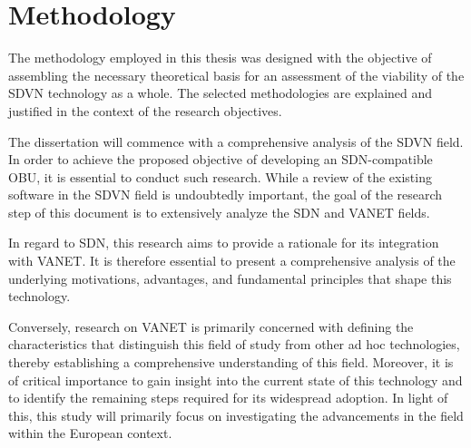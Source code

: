 








\section{Methodology} %
\label{sec:methodology}

The methodology employed in this thesis was designed with the objective of assembling the necessary theoretical basis for an assessment of the viability of the SDVN technology as a whole. The selected methodologies are explained and justified in the context of the research objectives.


The dissertation will commence with a comprehensive analysis of the SDVN field. In order to achieve the proposed objective of developing an SDN-compatible OBU, it is essential to conduct such research. While a review of the existing software in the SDVN field is undoubtedly important, the goal of the research step of this document is to extensively analyze the SDN and VANET fields.


In regard to SDN, this research aims to provide a rationale for its integration with VANET. It is therefore essential to present a comprehensive analysis of the underlying motivations, advantages, and fundamental principles that shape this technology.


Conversely, research on VANET is primarily concerned with defining the characteristics that distinguish this field of study from other ad hoc technologies, thereby establishing a comprehensive understanding of this field. Moreover, it is of critical importance to gain insight into the current state of this technology and to identify the remaining steps required for its widespread adoption. In light of this, this study will primarily focus on investigating the advancements in the field within the European context.


